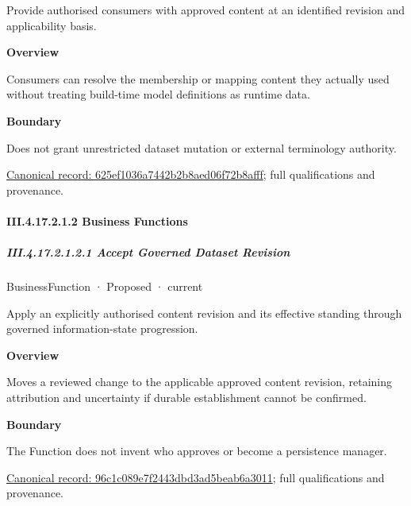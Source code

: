 Provide authorised consumers with approved content at an identified revision and applicability basis.



\textbf{Overview}



Consumers can resolve the membership or mapping content they actually used without treating build-time model definitions as runtime data.



\textbf{Boundary}



Does not grant unrestricted dataset mutation or external terminology authority.


{\footnotesize \href{../../../../continuum/business/business-service/625ef1036a7442b2b8aed06f72b8afff.md}{Canonical record: 625ef1036a7442b2b8aed06f72b8afff}; full qualifications and provenance.}\par
\paragraph*{III.4.17.2.1.2 Business Functions}
\label{navigation:III.4.17.2.1.2}

\subparagraph*{III.4.17.2.1.2.1 Accept Governed Dataset Revision}
\label{navigation:III.4.17.2.1.2.1}

\label{element:96c1c089e7f2443dbd3ad5beab6a3011}
{\small BusinessFunction · Proposed · current}\par

Apply an explicitly authorised content revision and its effective standing through governed information-state progression.



\textbf{Overview}



Moves a reviewed change to the applicable approved content revision, retaining attribution and uncertainty if durable establishment cannot be confirmed.



\textbf{Boundary}



The Function does not invent who approves or become a persistence manager.


{\footnotesize \href{../../../../continuum/business/business-function/96c1c089e7f2443dbd3ad5beab6a3011.md}{Canonical record: 96c1c089e7f2443dbd3ad5beab6a3011}; full qualifications and provenance.}\par
